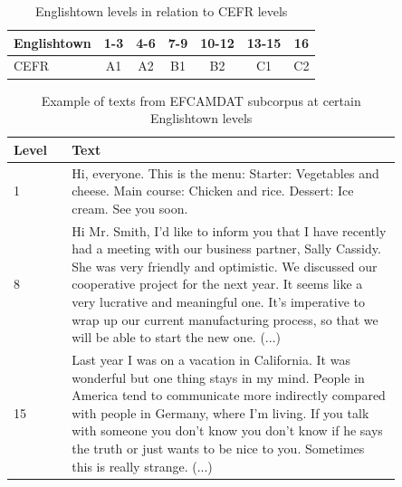\documentclass[11pt,a4paper]{article}
\begin{document}
\begin{table}
  \centering
  \begin{tabular}{l|cccccc}
    \toprule
    Englishtown & 1-3 & 4-6 & 7-9 & 10-12 & 13-15 & 16 \\
    \midrule
    CEFR & A1 & A2 & B1 & B2 & C1 & C2 \\
    \bottomrule
  \end{tabular}
  \caption{Englishtown levels in relation to CEFR levels}
  \label{tab:englishtown-cefr}
\end{table}

\begin{table}
  \centering
  \begin{tabular}{l|p{0.85\linewidth}}
    \toprule
    Level & Text  \\
    \midrule
    1 & Hi, everyone. This is the menu: Starter: Vegetables and cheese. Main
    course: Chicken and rice. Dessert: Ice cream. See you soon.\\
    \midrule
    8 & Hi Mr. Smith, I'd like to inform you that I have recently had a meeting
    with our business partner, Sally Cassidy. She was very friendly and
    optimistic. We discussed our cooperative project for the next year. It
    seems like a very lucrative and meaningful one. It's imperative to wrap up
    our current manufacturing process, so that we will be able to start the new
    one. (...)\\
    \midrule
    15 & Last year I was on a vacation in California. It was wonderful but
    one thing stays in my mind. People in America tend to communicate more
    indirectly compared with people in Germany, where I'm living. If you talk
    with someone you don't know you don't know if he says the truth or just
    wants to be nice to you. Sometimes this is really strange. (...)\\
    \bottomrule
  \end{tabular}
  \caption{Example of texts from EFCAMDAT subcorpus at certain Englishtown levels}
  \label{tab:efcamdat-examples}
\end{table}
\end{document}
